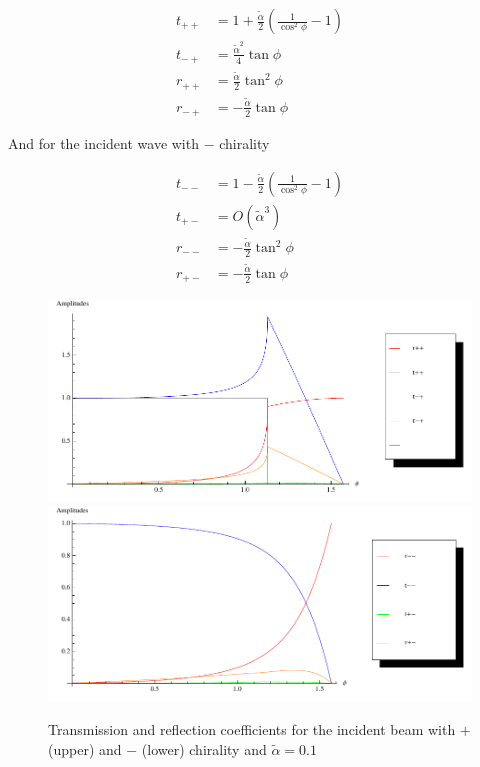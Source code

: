 \documentclass[11pt]{article}
\newcommand{\ta}{\tilde \alpha}
\begin{document}
\begin{align}
    t_{++} &= 1 +
            \frac{\ta}{2}\left( \frac{1}{\cos^2\phi} - 1 \right)\\
    t_{-+} &= \frac{\ta^2}{4}\tan \phi \\
    r_{++} &= \frac{\ta}{2} \tan^2 \phi\\
    r_{-+} &= -\frac{\ta}{2} \tan \phi
\end{align}

And for the incident wave with $-$ chirality

\begin{align}
    t_{--} &= 1 - \frac{\ta}{2} \left( \frac{1}{\cos^2\phi} - 1 \right)\\
    t_{+-} &= O(\ta^3)\\
    r_{--} &= -\frac{\ta}{2} \tan^2 \phi\\
    r_{+-} &= -\frac{\ta}{2} \tan \phi
\end{align}

\begin{figure}[h!tp]
    \includegraphics[width=\textwidth]{zero-plus.pdf}
    \includegraphics[width=\textwidth]{zero-minus.pdf}
    \caption{Transmission and reflection coefficients for the
            incident beam with $+$ (upper) and $-$ (lower) chirality
            and $\ta = 0.1$}
    \label{fig:trans-zero}
\end{figure}
\end{document}
